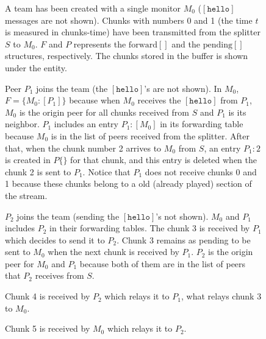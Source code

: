 \begin{center}
  \begin{figure}
     \caption{A team has been created with a
      single monitor $M_0$ ($[\mathtt{hello}]$ messages are not
      shown). Chunks with numbers 0 and 1 (the time $t$ is measured in
      chunks-time) have been transmitted from the splitter $S$ to
      $M_0$. $F$ and $P$ represents the $\text{forward}[]$ and the
      $\text{pending}[]$ structures, respectively. The chunks stored
      in the buffer is shown under the entity.\label{fig:team_0}}
  \end{figure}

  \begin{figure}
     \caption{Peer $P_1$ joins the team (the
      $[\mathtt{hello}]$'s are not shown). In $M_0$, $F=\{M_0:[P_1]\}$
      because when $M_0$ receives the $[\mathtt{hello}]$ from $P_1$,
      $M_0$ is the origin peer for all chunks received from $S$ and
      $P_1$ is its neighbor. $P_1$ includes an entry $P_1:[M_0]$ in
      its forwarding table because $M_0$ is in the list of peers
      received from the splitter. After that, when the chunk number 2
      arrives to $M_0$ from $S$, an entry $P_1:2$ is created in
      $P\{\}$ for that chunk, and this entry is deleted when the chunk
      2 is sent to $P_1$. Notice that $P_1$ does not receive chunks 0
      and 1 because these chunks belong to a old (already played)
      section of the stream.\label{fig:team_1}}
  \end{figure}

  \begin{figure}
     \caption{$P_2$ joins the team (sending the
      $[\mathtt{hello}]$'s not shown). $M_0$ and $P_1$ includes $P_2$
      in their forwarding tables. The chunk 3 is received by $P_1$
      which decides to send it to $P_2$. Chunk 3 remains as pending to
      be sent to $M_0$ when the next chunk is received by $P_1$. $P_2$
      is the origin peer for $M_0$ and $P_1$ because both of them are
      in the list of peers that $P_2$ receives from
      $S$. \label{fig:team_2}}
  \end{figure}

  \begin{figure}
     \caption{Chunk 4 is received by $P_2$
      which relays it to $P_1$, what relays chunk 3 to
      $M_0$.\label{fig:team_3}}
  \end{figure}

  \begin{figure}
     \caption{Chunk 5 is received by $M_0$
      which relays it to $P_2$.\label{fig:team_4}}
  \end{figure}


\end{center}
